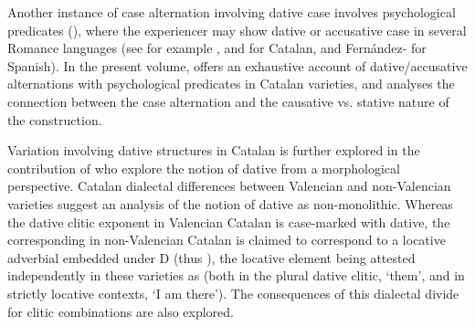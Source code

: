 \documentclass[output=paper,modfonts,nonflat]{langsci/langscibook}
\begin{document}
\begin{styleNormalWeb}
Another instance of case alternation involving dative case involves psychological predicates (), where the experiencer may show dative or accusative case in several Romance languages (see for example \citet{MateuCabré2002}, \citet{PinedaRoyo2017} and \citet{Royo2017} for Catalan, and Fernández-\citet{Ordóñez1999} for Spanish). In the present volume, offers an exhaustive account of dative/accusative alternations with psychological predicates in Catalan varieties, and analyses the connection between the case alternation and the causative vs. stative nature of the construction.
\end{styleNormalWeb}

\begin{styleListNumberi}
Variation involving dative structures in Catalan is further explored in  the contribution of who explore the notion of dative from a morphological perspective. Catalan dialectal differences between Valencian and non-Valencian varieties suggest an analysis of the notion of dative as non-monolithic. Whereas the dative clitic exponent in Valencian Catalan is case-marked with dative, the corresponding in non-Valencian Catalan is claimed to correspond to a locative adverbial embedded under D (thus ), the locative element being attested independently in these varieties as (both in the plural dative clitic,  ‘them’, and in strictly locative contexts, ‘I am there’). The consequences of this dialectal divide for clitic combinations are also explored.
\end{styleListNumberi}
\end{document}
